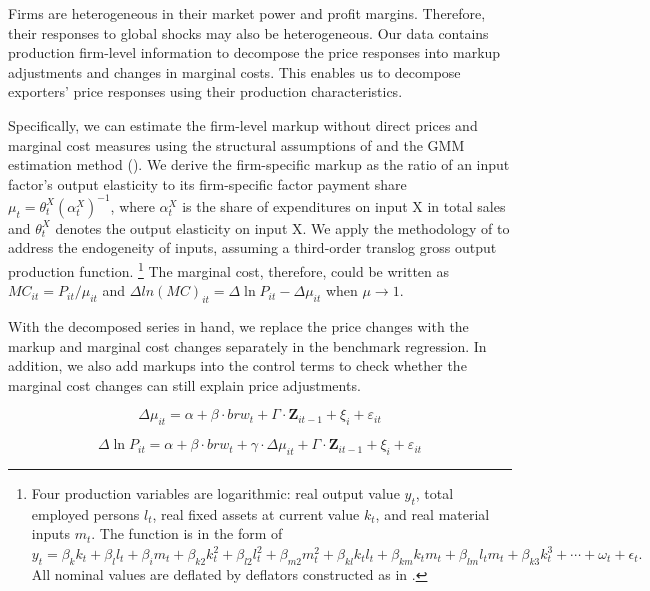 Firms are heterogeneous in their market power and profit margins. Therefore, their responses to global shocks may also be heterogeneous. Our data contains production firm-level information to decompose the price responses into markup adjustments and changes in marginal costs. This enables us to decompose exporters' price responses using their production characteristics.

Specifically, we can estimate the firm-level markup without direct prices and marginal cost measures using the structural assumptions of \cite{deloecker2012markups} and the GMM estimation method (\cite{brooks2021agglomeration}). We derive the firm-specific markup as the ratio of an input factor's output elasticity to its firm-specific factor payment share $\mu_{t}=\theta_{t}^{X}\left(\alpha_{t}^{X}\right)^{-1}$, where $\alpha_{t}^{X}$ is the share of expenditures on input X in total sales and $\theta^X_t$ denotes the output elasticity on input X. We apply the methodology of \cite{ackerberg2015} to address the endogeneity of inputs, assuming a third-order translog gross output production function. \footnote{Four production variables are logarithmic: real output value $y_t$, total employed persons $l_t$, real fixed assets at current value $k_t$, and real material inputs $m_t$. The function is in the form of $
    y_{t}= \beta_{k} k_{t}+\beta_{l} l_{t}+\beta_{i} m_{t}+\beta_{k 2} k_{t}^{2}+\beta_{l 2} l_{t}^{2}+\beta_{m 2} m_{t}^{2}+\beta_{k l} k_{ t} l_{t}+\beta_{k m} k_{t} m_{t}+\beta_{l m} l_{t} m_{t} + \beta_{k 3} k_{t}^{3}+\cdots+\omega_{t}+\epsilon_{t}.
$
All nominal values are deflated by deflators constructed as in \cite{brandt2012}.} The marginal cost, therefore, could be written as $MC_{it}=P_{it} / \mu_{it}$ and $\Delta ln(MC)_{it}= \Delta \ln P_{it} - \Delta \mu_{it}$ when $\mu \rightarrow 1$. 

With the decomposed series in hand, we replace the price changes with the markup and marginal cost changes separately in the benchmark regression. In addition, we also add markups into the control terms to check whether the marginal cost changes can still explain price adjustments.

\begin{equation}
    \Delta \mu_{it} = \alpha +\beta \cdot brw_{t}+ \Gamma \cdot \textbf{Z}_{it-1}+\xi_{i}+\varepsilon_{it} \label{reg.markup}
\end{equation}

\begin{equation}
    \Delta \ln P_{it} = \alpha+\beta \cdot brw_{t}+ \gamma \cdot \Delta \mu_{it}+ \Gamma \cdot \textbf{Z}_{it-1}+\xi_{i}+\varepsilon_{i t} \label{reg.markup_int}
\end{equation}

